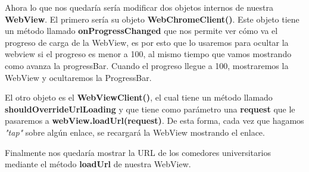 \documentclass[a4paper,11pt]{article}
\begin{document}
\vspace{5 mm}

Ahora lo que nos quedaría sería modificar dos objetos internos de nuestra \textbf{WebView}. El primero sería su objeto \textbf{WebChromeClient()}. Este objeto tiene un método llamado \textbf{onProgressChanged} que nos permite ver cómo va el progreso de carga de la WebView, es por esto que lo usaremos para ocultar la webview si el progreso es menor a 100, al mismo tiempo que vamos mostrando como avanza la progressBar. Cuando el progreso llegue a 100, mostraremos la WebView y ocultaremos la ProgressBar.

\vspace{5 mm}

El otro objeto es el \textbf{WebViewClient()}, el cual tiene un método llamado \textbf{shouldOverrideUrlLoading} y que tiene como parámetro una \textbf{request} que le pasaremos a \textbf{webView.loadUrl(request)}. De esta forma, cada vez que hagamos \textit{"tap"} sobre algún enlace, se recargará la WebView mostrando el enlace.

\vspace{5 mm}

Finalmente nos quedaría mostrar la URL de los comedores universitarios mediante el método \textbf{loadUrl} de nuestra WebView.

\newpage
\end{document}
